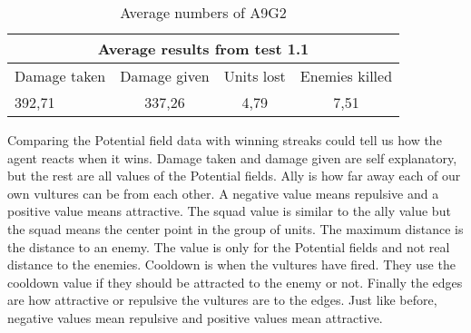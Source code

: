 \begin{table}
\begin{centering}

 \begin{tabular}{|l|c|c|c|}
	\multicolumn{4}{c}{Average results from test 1.1} \\
	\hline
		Damage taken & Damage given & Units lost & Enemies killed\\
	\hline
		392,71 & 337,26 & 4,79 & 7,51 \\
	\hline
\end{tabular}
\caption{Average numbers of A9G2}
\label{test1.1}
\end{centering}
\end{table}
\newpage
Comparing the Potential field data with winning streaks could tell us how the agent reacts when it wins. Damage taken and damage given are self explanatory, but the rest are all values of the Potential fields. Ally is how far away each of our own vultures can be from each other. A negative value means repulsive and a positive value means attractive. The squad value is similar to the ally value but the squad means the center point in the group of units. The maximum distance is the distance to an enemy. The value is only for the Potential fields and not real distance to the enemies. Cooldown is when the vultures have fired. They use the cooldown value if they should be attracted to the enemy or not. Finally the edges are how attractive or repulsive the vultures are to the edges. Just like before, negative values mean repulsive and positive values mean attractive. 
\newpage
